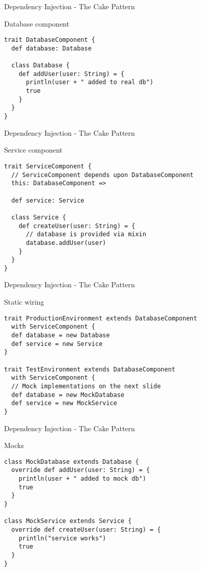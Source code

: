 \begin{frame}[fragile]{Dependency Injection - The Cake Pattern}
\begin{exampleblock}{Database component}
\begin{lstlisting}
trait DatabaseComponent {
  def database: Database

  class Database {
    def addUser(user: String) = {
      println(user + " added to real db")
      true
    }
  }
}
\end{lstlisting}
\end{exampleblock}
\end{frame}

\begin{frame}[fragile]{Dependency Injection - The Cake Pattern}
\begin{exampleblock}{Service component}
\begin{lstlisting}
trait ServiceComponent {
  // ServiceComponent depends upon DatabaseComponent
  this: DatabaseComponent =>
  
  def service: Service
  
  class Service {
    def createUser(user: String) = {
      // database is provided via mixin
      database.addUser(user)
    }
  }
}
\end{lstlisting}
\end{exampleblock}
\end{frame}

\begin{frame}[fragile]{Dependency Injection - The Cake Pattern}
\begin{exampleblock}{Static wiring}
\begin{lstlisting}
trait ProductionEnvironment extends DatabaseComponent
  with ServiceComponent {
  def database = new Database
  def service = new Service
}

trait TestEnvironment extends DatabaseComponent
  with ServiceComponent {
  // Mock implementations on the next slide
  def database = new MockDatabase
  def service = new MockService
}
\end{lstlisting}
\end{exampleblock}
\end{frame}

\begin{frame}[fragile]{Dependency Injection - The Cake Pattern}
\begin{exampleblock}{Mocks}
\begin{lstlisting}
class MockDatabase extends Database {
  override def addUser(user: String) = {
    println(user + " added to mock db")
    true
  }
}

class MockService extends Service {
  override def createUser(user: String) = {
    println("service works")
    true
  }
}
\end{lstlisting}
\end{exampleblock}
\end{frame}

